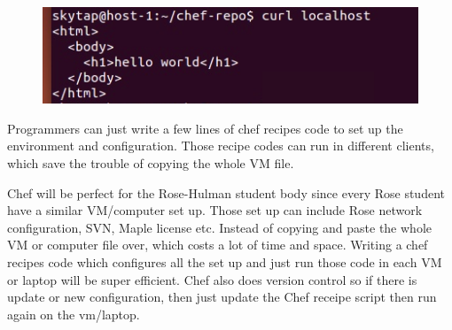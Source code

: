 \documentclass[12pt,letterpaper,boxed]{hmcpset}
\begin{document}
\begin{figure}[H]
  \centering
  \includegraphics[width = 1.0\textwidth]{33.png}
\end{figure}
\begin{problem}
\end{problem}
\newline
Programmers can just write a few lines of chef recipes code to set up the environment and configuration. Those recipe codes can run in different clients, which save the trouble of copying the whole VM file.
\newline
\begin{problem}
\end{problem}
\newline
Chef will be perfect for the Rose-Hulman student body since every Rose student have a similar VM/computer set up. Those set up can include Rose network configuration, SVN, Maple license etc. Instead of copying and paste the whole VM or computer file over, which costs a lot of time and space. Writing a chef recipes code which configures all the set up and just run those code in each VM or laptop will be super efficient. Chef also does version control so if there is update or new configuration, then just update the Chef receipe script then run again on the vm/laptop.
\end{document}
